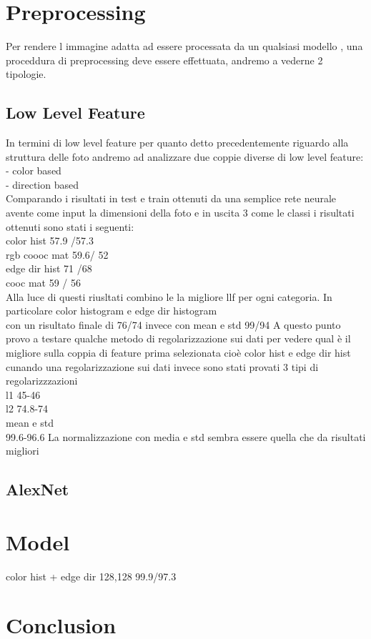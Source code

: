 \documentclass[a4paper,10pt]{article}
\begin{document}
\section{Preprocessing}
Per rendere l immagine adatta ad essere processata da un qualsiasi modello , una proceddura di preprocessing deve essere effettuata, andremo a vederne 2 tipologie.
\subsection{Low Level Feature}
In termini di low level feature per quanto detto precedentemente riguardo alla struttura delle foto andremo ad analizzare due coppie diverse di low level feature:\\
- color based \\
- direction based\\
Comparando i risultati in test e train ottenuti da una semplice rete neurale avente come input la dimensioni della foto e in uscita 3 come le classi i risultati ottenuti sono stati i seguenti:\\
color hist 57.9 /57.3\\
rgb coooc mat 59.6/ 52\\
edge dir hist 71 /68\\
cooc mat 59 / 56\\
Alla luce di questi riusltati combino le la migliore llf per ogni categoria.  In particolare color histogram e edge dir histogram\\ con un risultato finale di 76/74 invece con mean e std 99/94
A questo punto provo a testare qualche metodo di regolarizzazione sui dati per vedere qual è il migliore sulla coppia di feature prima selezionata cioè color hist e edge dir hist
cunando una regolarizzazione sui dati invece sono stati provati 3 tipi di regolarizzzazioni\\
l1 45-46\\
l2 74.8-74\\
mean e std \\99.6-96.6
La normalizzazione con media e std sembra essere quella che da risultati migliori
\subsection{AlexNet}
\section{Model}


color hist + edge dir 128,128 99.9/97.3
\section{Conclusion}
\end{document}
